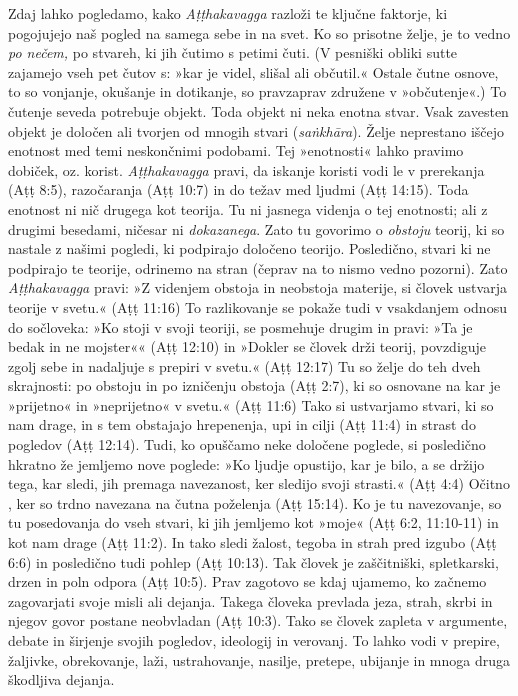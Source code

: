 Zdaj lahko pogledamo, kako \emph{Aṭṭhakavagga} razloži te ključne
faktorje, ki pogojujejo naš pogled na samega sebe in na svet. Ko so
prisotne želje, je to vedno \emph{po nečem,} po stvareh, ki jih čutimo s
petimi čuti. (V pesniški obliki sutte zajamejo vseh pet čutov s: »kar je
videl, slišal ali občutil.« Ostale čutne osnove, to so vonjanje,
okušanje in dotikanje, so pravzaprav združene v »občutenje«.) To čutenje
seveda potrebuje objekt. Toda objekt ni neka enotna stvar. Vsak zavesten
objekt je določen ali tvorjen od mnogih stvari (\emph{saṅkhāra}). Želje
neprestano iščejo enotnost med temi neskončnimi podobami. Tej
»enotnosti« lahko pravimo dobiček, oz. korist. \emph{Aṭṭhakavagga}
pravi, da iskanje koristi vodi le v prerekanja (Aṭṭ 8:5), razočaranja
(Aṭṭ 10:7) in do težav med ljudmi (Aṭṭ 14:15). Toda enotnost ni nič
drugega kot teorija. Tu ni jasnega videnja o tej enotnosti; ali z
drugimi besedami, ničesar ni \emph{dokazanega}. Zato tu govorimo o
\emph{obstoju} teorij, ki so nastale z našimi pogledi, ki podpirajo
določeno teorijo. Posledično, stvari ki ne podpirajo te teorije,
odrinemo na stran (čeprav na to nismo vedno pozorni). Zato
\emph{Aṭṭhakavagga} pravi: »Z videnjem obstoja in neobstoja materije, si
človek ustvarja teorije v svetu.« (Aṭṭ 11:16) To razlikovanje se pokaže
tudi v vsakdanjem odnosu do sočloveka: »Ko stoji v svoji teoriji, se
posmehuje drugim in pravi: »Ta je bedak in ne mojster«« (Aṭṭ 12:10) in
»Dokler se človek drži teorij, povzdiguje zgolj sebe in nadaljuje s
prepiri v svetu.« (Aṭṭ 12:17) Tu so želje do teh dveh skrajnosti: po
obstoju in po izničenju obstoja (Aṭṭ 2:7), ki so osnovane na kar je
»prijetno« in »neprijetno« v svetu.« (Aṭṭ 11:6) Tako si ustvarjamo
stvari, ki so nam drage, in s tem obstajajo hrepenenja, upi in cilji
(Aṭṭ 11:4) in strast do pogledov (Aṭṭ 12:14). Tudi, ko opuščamo neke
določene poglede, si posledično hkratno že jemljemo nove poglede: »Ko
ljudje opustijo, kar je bilo, a se držijo tega, kar sledi, jih premaga
navezanost, ker sledijo svoji strasti.« (Aṭṭ 4:4) Očitno , ker so trdno
navezana na čutna poželenja (Aṭṭ 15:14). Ko je tu navezovanje, so tu
posedovanja do vseh stvari, ki jih jemljemo kot »moje« (Aṭṭ 6:2,
11:10-11) in kot nam drage (Aṭṭ 11:2). In tako sledi žalost, tegoba in
strah pred izgubo (Aṭṭ 6:6) in posledično tudi pohlep (Aṭṭ 10:13). Tak
človek je zaščitniški, spletkarski, drzen in poln odpora (Aṭṭ 10:5).
Prav zagotovo se kdaj ujamemo, ko začnemo zagovarjati svoje misli ali
dejanja. Takega človeka prevlada jeza, strah, skrbi in njegov govor
postane neobvladan (Aṭṭ 10:3). Tako se človek zapleta v argumente,
debate in širjenje svojih pogledov, ideologij in verovanj. To lahko vodi
v prepire, žaljivke, obrekovanje, laži, ustrahovanje, nasilje, pretepe,
ubijanje in mnoga druga škodljiva dejanja.

